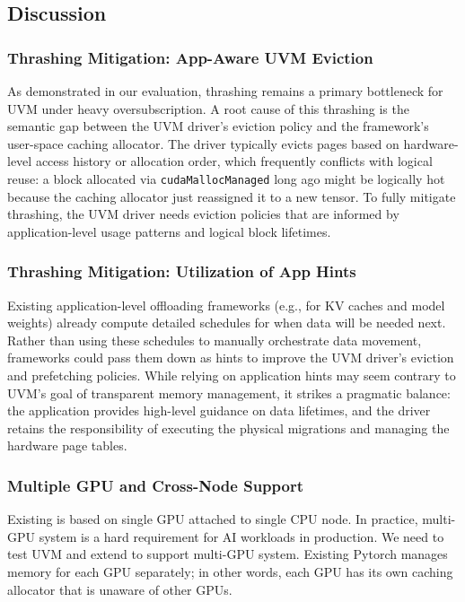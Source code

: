 \subsection{Discussion}

\subsubsection{Thrashing Mitigation: App-Aware UVM Eviction}
\label{uvm:sec:future:thrash}
As demonstrated in our evaluation,
    thrashing remains a primary bottleneck for UVM under heavy oversubscription.
A root cause of this thrashing is the semantic gap between
    the UVM driver's eviction policy and the framework's user-space caching allocator.
The driver typically evicts pages based on hardware-level access history or allocation order,
    which frequently conflicts with logical reuse:
    a block allocated via \texttt{cudaMallocManaged} long ago
    might be logically hot because the caching allocator just reassigned it to a new tensor.
To fully mitigate thrashing,
    the UVM driver needs eviction policies that are informed by
    application-level usage patterns and logical block lifetimes.

\subsubsection{Thrashing Mitigation: Utilization of App Hints}
\label{uvm:sec:future:hints}
Existing application-level offloading frameworks
    (e.g., for KV caches and model weights)
    already compute detailed schedules for when data will be needed next.
Rather than using these schedules to manually orchestrate data movement,
    frameworks could pass them down as hints to improve the UVM driver's
    eviction and prefetching policies.
While relying on application hints may seem contrary to UVM's goal
    of transparent memory management,
    it strikes a pragmatic balance:
    the application provides high-level guidance on data lifetimes,
    and the driver retains the responsibility of executing
    the physical migrations and managing the hardware page tables.


\subsubsection{Multiple GPU and Cross-Node Support}
Existing \uvmname is based on single GPU attached to single CPU node.
In practice, multi-GPU system is a hard requirement for AI workloads in production.
We need to test UVM and extend \uvmname to support multi-GPU system.
Existing Pytorch manages memory for each GPU separately;
in other words, each GPU has its own caching allocator that is unaware of other GPUs.

